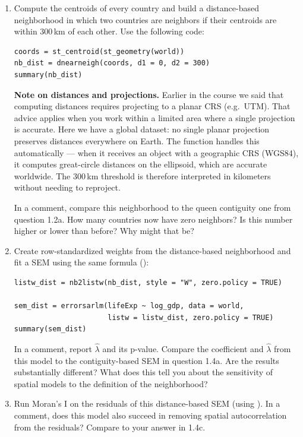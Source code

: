 \begin{enumerate}[label=\alph*)]

  \item Compute the centroids of every country and build a distance-based neighborhood in which two countries are neighbors if their centroids are within 300\,km of each other. Use the following code:
  \begin{lstlisting}
coords = st_centroid(st_geometry(world))
nb_dist = dnearneigh(coords, d1 = 0, d2 = 300)
summary(nb_dist)
  \end{lstlisting}
  \textbf{Note on distances and projections.} Earlier in the course we said that computing distances requires projecting to a planar CRS (e.g.\ UTM). That advice applies when you work within a limited area where a single projection is accurate. Here we have a global dataset: no single planar projection preserves distances everywhere on Earth. The function  handles this automatically --- when it receives an  object with a geographic CRS (WGS84), it computes great-circle distances on the ellipsoid, which are accurate worldwide. The 300\,km threshold is therefore interpreted in kilometers without needing to reproject.

  In a comment, compare this neighborhood to the queen contiguity one from question 1.2a. How many countries now have zero neighbors? Is this number higher or lower than before? Why might that be?

  \item Create row-standardized weights from the distance-based neighborhood and fit a SEM using the same formula ():
  \begin{lstlisting}
listw_dist = nb2listw(nb_dist, style = "W", zero.policy = TRUE)

sem_dist = errorsarlm(lifeExp ~ log_gdp, data = world,
                      listw = listw_dist, zero.policy = TRUE)
summary(sem_dist)
  \end{lstlisting}
  In a comment, report $\hat{\lambda}$ and its p-value. Compare the  coefficient and $\hat{\lambda}$ from this model to the contiguity-based SEM in question 1.4a. Are the results substantially different? What does this tell you about the sensitivity of spatial models to the definition of the neighborhood?

  \item Run Moran's I on the residuals of this distance-based SEM (using ). In a comment, does this model also succeed in removing spatial autocorrelation from the residuals? Compare to your answer in 1.4c.

\end{enumerate}

